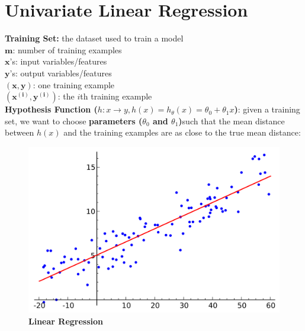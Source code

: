 \documentclass{article}
\begin{document}
    \pagebreak
    \section{Univariate Linear Regression}
        \noindent \textbf{Training Set:} the dataset used to train a model \\
        $\bm{m}$: number of training examples \\
        $\bm{x}$'s: input variables/features \\
        $\bm{y}$'s: output variables/features \\
        $\bm{(x,y)}$: one training example \\
        $\bm{(x^{(i)}, y^{(i)})}$: the $i$th training example \\
        \textbf{Hypothesis Function ($h:x\to y,h(x)=h_\theta (x)=\theta_0+\theta_1 x$)}: given a training set,
        we want to choose \textbf{parameters ($\theta_0$ and $\theta_1$)}such that the mean distance between
        $h(x)$ and the training examples are as close to the true mean distance:

        \begin{figure}[hbt!]
            \centering
            \includegraphics[scale=0.2]{Resources/Linear_Regression.png}
            \caption*{\textbf{Linear Regression}}
        \end{figure}
\end{document}
